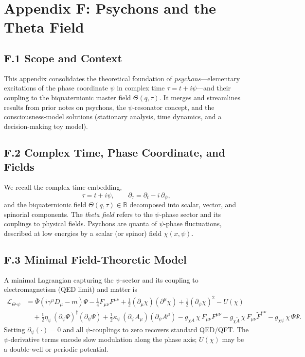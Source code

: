 \appendix
\section{Appendix F: Psychons and the Theta Field}
\subsection*{F.1 Scope and Context}
This appendix consolidates the theoretical foundation of \emph{psychons}---elementary excitations of the phase coordinate $\psi$ in complex time $\tau=t+i\psi$---and their coupling to the biquaternionic master field $\Theta(q,\tau)$. It merges and streamlines results from prior notes on psychons, the $\psi$-resonator concept, and the consciousness-model solutions (stationary analysis, time dynamics, and a decision-making toy model).

\subsection*{F.2 Complex Time, Phase Coordinate, and Fields}
We recall the complex-time embedding,
\begin{equation}
\tau = t + i\psi,\qquad \partial_\tau = \partial_t - i\,\partial_\psi,
\end{equation}
and the biquaternionic field $\Theta(q,\tau)\in\mathbb{B}$ decomposed into scalar, vector, and spinorial components. The \emph{theta field} refers to the $\psi$-phase sector and its couplings to physical fields. Psychons are quanta of $\psi$-phase fluctuations, described at low energies by a scalar (or spinor) field $\chi(x,\psi)$.

\subsection*{F.3 Minimal Field-Theoretic Model}
A minimal Lagrangian capturing the $\psi$-sector and its coupling to electromagnetism (QED limit) and matter is
\begin{align}
\mathcal{L}_{\Theta\text{-}\psi} &= \bar{\Psi}(i\gamma^\mu D_\mu - m)\Psi - \frac{1}{4}F_{\mu\nu}F^{\mu\nu}
+ \frac{1}{2}(\partial_\mu \chi)(\partial^\mu \chi) + \frac{1}{2}(\partial_\psi \chi)^2 - U(\chi) \nonumber\\
&\quad + \frac{1}{2}\eta_\psi\,(\partial_\psi \Psi)^\dagger(\partial_\psi \Psi)
+ \frac{1}{2}\kappa_\psi\,(\partial_\psi A_\mu)(\partial_\psi A^\mu)
- g_{\chi A}\,\chi\,F_{\mu\nu}F^{\mu\nu}
- g_{\chi \tilde{A}}\,\chi\,F_{\mu\nu}\tilde{F}^{\mu\nu}
- g_{\chi \psi}\,\chi\,\bar{\Psi}\Psi.
\end{align}
Setting $\partial_\psi(\cdot)=0$ and all $\psi$-couplings to zero recovers standard QED/QFT. The $\psi$-derivative terms encode slow modulation along the phase axis; $U(\chi)$ may be a double-well or periodic potential.

